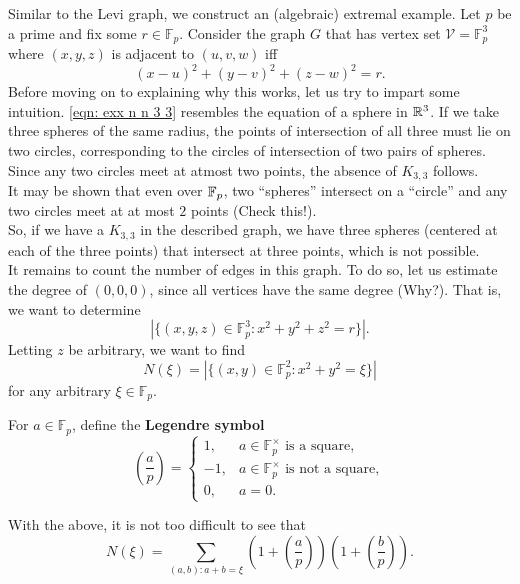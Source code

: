 \documentclass{article}
\begin{document}
		Similar to the Levi graph, we construct an (algebraic) extremal example. Let $p$ be a prime and fix some $r\in\mathbb{F}_p$.
		Consider the graph $G$ that has vertex set $\mathcal{V} = \mathbb{F}_p^3$ where $(x,y,z)$ is adjacent to $(u,v,w)$ iff 
		\begin{equation}
			\label{eqn: exx n n 3 3}
			(x-u)^2 + (y-v)^2 + (z-w)^2 = r.
		\end{equation}
		Before moving on to explaining why this works, let us try to impart some intuition. \eqref{eqn: exx n n 3 3} resembles the equation of a sphere in $\mathbb{R}^3$. If we take three spheres of the same radius, the points of intersection of all three must lie on two circles, corresponding to the circles of intersection of two pairs of spheres. Since any two circles meet at atmost two points, the absence of $K_{3,3}$ follows.\\
		It may be shown that even over $\mathbb{F}_p$, two ``spheres'' intersect on a ``circle'' and any two circles meet at at most $2$ points (Check this!).\\
		So, if we have a $K_{3,3}$ in the described graph, we have three spheres (centered at each of the three points) that intersect at three points, which is not possible.\\

		It remains to count the number of edges in this graph. To do so, let us estimate the degree of $(0,0,0)$, since all vertices have the same degree (Why?). That is, we want to determine
		\[ |\{(x,y,z)\in\mathbb{F}_p^3 : x^2 + y^2 + z^2 = r\}|. \]
		Letting $z$ be arbitrary, we want to find
		\[ N(\xi) = |\{(x,y)\in\mathbb{F}_p^2 : x^2 + y^2 = \xi\}| \]
		for any arbitrary $\xi \in \mathbb{F}_p$.

		\begin{fdef}
			For $a \in \mathbb{F}_p$, define the \textbf{Legendre symbol}
			\[
				\left(\frac{a}{p}\right) =
				\begin{cases}
					1, & \text{$a\in\mathbb{F}_p^\times$ is a square}, \\
					-1, & \text{$a\in\mathbb{F}_p^\times$ is not a square}, \\
					0, & a=0.
				\end{cases}
			\]
		\end{fdef}

		With the above, it is not too difficult to see that
		\[ N(\xi) = \sum_{(a,b): a + b = \xi} \left(1 + \left(\frac{a}{p}\right) \right) \left(1 + \left(\frac{b}{p}\right)\right). \]
\end{document}
